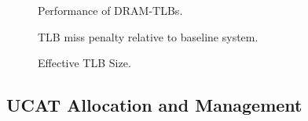 % 
% 

\begin{figure}[tp] 
  \vspace{-0.in} \centering
  \centerline{}

  \caption{\small Performance of DRAM-TLBs. \normalsize}
  \label{fig:perf_UCAT} 
  \vspace{0.2 in}
\end{figure}

\begin{figure}[tp] 
  \vspace{0.in} \centering
  \centerline{}

  \caption{\small TLB miss penalty relative to baseline system.\normalsize}
  \label{fig:tlblat_UCAT} 
  \vspace{-0.1 in}
\end{figure}

\begin{figure}[tp] 
  \vspace{0.in} \centering
  \centerline{}

  \caption{\small Effective TLB Size.\normalsize}
  \label{fig:tlblat_UCAT} 
  \vspace{-0.1 in}
\end{figure}

\subsection{UCAT Allocation and Management}

